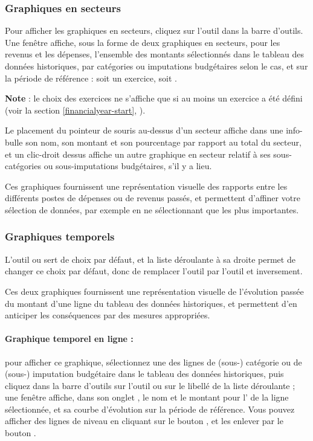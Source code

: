 \subsubsection{Graphiques en secteurs}

Pour afficher les graphiques en secteurs, cliquez sur l'outil  dans la barre d'outils. Une fenêtre affiche, sous la forme de deux graphiques en secteurs, pour les revenus et les dépenses, l'ensemble des montants sélectionnés dans le tableau des données historiques, par catégories ou imputations budgétaires selon le cas, et sur la période de référence : soit un exercice, soit .

\textbf{Note} : le choix des exercices ne s'affiche que si au moins un exercice a été défini (voir la section \vref{financialyear-start}, ).

Le placement du pointeur de souris au-dessus d'un secteur affiche dans une info-bulle son nom, son montant et son pourcentage par rapport au total du secteur, et un clic-droit dessus affiche un autre graphique en secteur relatif à ses sous-catégories ou sous-imputations budgétaires, s'il y a lieu.

Ces graphiques fournissent une représentation visuelle des rapports entre les différents postes de dépenses ou de revenus passés, et permettent d'affiner votre sélection de données, par exemple en ne sélectionnant que les plus importantes.


\subsubsection{Graphiques temporels}

L'outil  ou  sert de choix par défaut, et la liste déroulante à sa droite permet de changer ce choix par défaut, donc de remplacer l'outil  par l'outil  et inversement.

Ces deux graphiques fournissent une représentation visuelle de l'évolution passée du montant  d'une ligne du tableau des données historiques, et permettent d'en anticiper les conséquences par des mesures appropriées.

\paragraph{Graphique temporel en ligne :} pour afficher ce graphique, sélectionnez une des lignes de (sous-) catégorie ou de (sous-) imputation budgétaire dans le tableau des données historiques, puis cliquez dans la barre d'outils sur l'outil  ou sur le libellé  de la liste déroulante ; une fenêtre affiche, dans son onglet , le nom et le montant pour l' de la ligne sélectionnée, et sa courbe d'évolution sur la période de référence. Vous pouvez afficher des lignes de niveau en cliquant sur le bouton , et les enlever par le bouton . 

